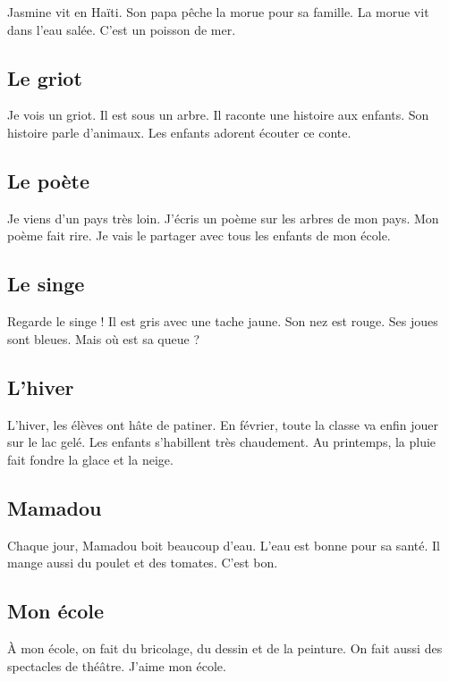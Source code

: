 \documentclass[11pt, french]{article}
\begin{document}
Jasmine vit en Haïti. Son papa pêche la morue pour sa famille. La morue vit dans l'eau salée. C'est un poisson de mer.

\subsection{Le griot}

Je vois un griot. Il est sous un arbre. Il raconte une histoire aux enfants. Son histoire parle d'animaux. Les enfants adorent écouter ce conte.

\subsection{Le poète}

Je viens d'un pays très loin. J'écris un poème sur les arbres de mon pays. Mon poème fait rire. Je vais le partager avec tous les enfants de mon école.

\subsection{Le singe}

Regarde le singe ! Il est gris avec une tache jaune. Son nez est rouge. Ses joues sont bleues. Mais où est sa queue ?

\subsection{L'hiver}

L'hiver, les élèves ont hâte de patiner. En février, toute la classe va enfin jouer sur le lac gelé. Les enfants s'habillent très chaudement. Au printemps, la pluie fait fondre la glace et la neige.

\subsection{Mamadou}

Chaque jour, Mamadou boit beaucoup d'eau. L'eau est bonne pour sa santé. Il mange aussi du poulet et des tomates. C'est bon.

\subsection{Mon école}

À mon école, on fait du bricolage, du dessin et de la peinture. On fait aussi des spectacles de théâtre. J'aime mon école.
\end{document}

